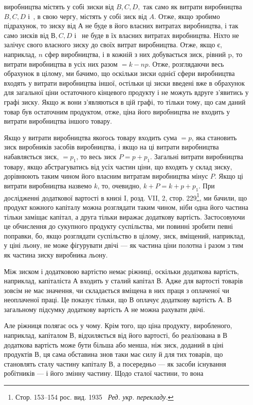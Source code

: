 \parcont{}  %
виробництва містять у собі зиски від $B, C, D,$ так само як витрати виробництва $B, C, D$ і~, в
свою чергу, містять у собі
зиск від $A$. Отже, якщо зробимо підрахунок, то зиску від $А$ не
буде в його власних витратах виробництва, і так само зисків
від $В, C, D$ і~ не буде в їх власних витратах виробництва.
Ніхто не залічує свого власного зиску до своїх витрат виробництва. Отже, якщо є, наприклад, $n$ сфер
виробництва, і в кожній з них добувається зиск, рівний p, то витрати виробництва в усіх них разом
$= k - np$. Отже, розглядаючи весь обрахунок
в цілому, ми бачимо, що оскільки зиски однієї сфери виробництва входять у витрати виробництва іншої,
остільки ці зиски
введені вже в обрахунок для загальної ціни остаточного кінцевого
продукту і не можуть вдруге з’явитись у графі зиску. Якщо ж
вони з’являються в цій графі, то тільки тому, що сам даний
товар був остаточним продуктом, отже, ціна його виробництва
не входить у витрати виробництва іншого товару.

Якщо у витрати виробництва якогось товару входить сума $= p$, яка становить зиск виробників засобів
виробництва, і якщо
на ці витрати виробництва набавляється зиск, $= p_1$, то весь зиск
$P = p + p_1$. Загальні витрати виробництва товару, якщо абстрагуватись від усіх частин ціни, що
входять у склад зиску, дорівнюють таким чином його власним витратам виробництва мінус $P$.
Якщо ці витрати виробництва назвемо $k$, то, очевидно, $k + P = k + p + p_1$. При дослідженні додаткової
вартості в книзі I,
розд. VII, 2, стор. 229\footnote*{Стор. 153--154 рос. вид. 1935~ \emph{Ред. укр. перекладу.}}, ми бачили, що продукт кожного капіталу можна розглядати таким чином, ніби
одна його частина
тільки заміщає капітал, а друга тільки виражає додаткову вартість. Застосовуючи це обчислення до
сукупного продукту
суспільства, ми повинні зробити певні поправки, бо, якщо
розглядати суспільство в цілому, зиск, вміщений, наприклад,
у ціні льону, не може фігурувати двічі — як частина ціни полотна
і разом з тим як частина зиску виробника льону.

Між зиском і додатковою вартістю немає ріжниці, оскільки
додаткова вартість, наприклад, капіталіста $А$ входить у сталий
капітал $В$. Адже для вартості товарів зовсім не має значення, чи
складається вміщена в них праця з оплаченої чи неоплаченої праці.
Це показує тільки, що $В$ оплачує додаткову вартість $А$. В загальному підсумку додаткову вартість $А$ не
можна рахувати двічі.

Але ріжниця полягає ось у чому. Крім того, що ціна продукту,
виробленого, наприклад, капіталом $В$, відхиляється від його вартості, бо реалізована в $В$ додаткова
вартість може бути більша
або менша, ніж зиск, доданий в ціні продуктів $В$, ця сама обставина
знов таки має силу й для тих товарів, що становлять сталу
частину капіталу $В$, а посередньо — як засоби існування робітників — і його змінну частину. Щодо
сталої частини, то вона
\parbreak{}  %
